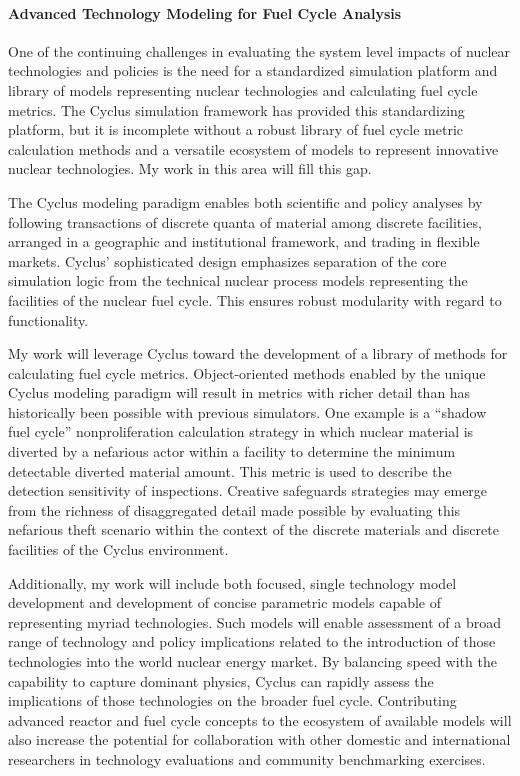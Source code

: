 \documentclass[a4paper, 10pt]{article}
\begin{document}
\paragraph{Advanced Technology Modeling for Fuel Cycle Analysis} 

One of the continuing challenges in evaluating the system level impacts of 
nuclear technologies and policies is the need for a standardized simulation 
platform and library of models representing nuclear technologies and calculating 
fuel cycle metrics.  The Cyclus simulation framework 
has provided this standardizing platform, but it is incomplete without a 
robust library of fuel cycle metric calculation methods and a versatile ecosystem of 
models to represent innovative nuclear technologies. My work in this area will 
fill this gap. 

The Cyclus modeling paradigm enables both scientific and policy analyses by 
following transactions of discrete quanta of material among discrete facilities, 
arranged in a geographic and institutional framework, and trading in flexible 
markets. Cyclus' sophisticated design emphasizes separation of the core simulation logic 
from the technical nuclear process models representing the facilities of the 
nuclear fuel cycle. This ensures robust modularity with regard to functionality.  

My work will leverage Cyclus toward the development of a library 
of methods for calculating fuel cycle metrics.  Object-oriented methods enabled 
by the unique Cyclus modeling paradigm will result in metrics with richer detail 
than has historically been possible with previous simulators. One example is a 
``shadow fuel cycle'' nonproliferation calculation strategy in which nuclear material is 
diverted by a nefarious actor within a facility to determine the minimum 
detectable diverted material amount.  This metric is used to describe the 
detection sensitivity of inspections.  Creative safeguards strategies may emerge 
from the richness of disaggregated detail made possible by evaluating this 
nefarious theft scenario within the context of the discrete materials and 
discrete facilities of the Cyclus environment.

Additionally, my work will include both focused, single technology model development and 
development of concise parametric models capable of representing myriad 
technologies.  Such models will enable assessment of a broad range of technology 
and policy implications related to the introduction of those technologies into 
the world nuclear energy market. By balancing speed with the capability to 
capture dominant physics, Cyclus can rapidly assess the implications of those 
technologies on the broader fuel cycle.  Contributing advanced reactor and fuel 
cycle concepts to the ecosystem of available models will also increase the 
potential for collaboration with other domestic and international researchers in 
technology evaluations and community benchmarking exercises.
\end{document}
